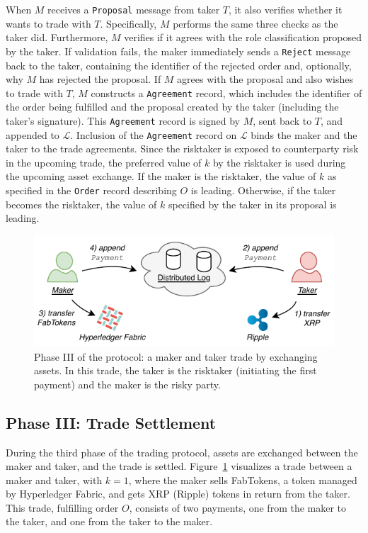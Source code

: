 When $ M $ receives a \texttt{Proposal} message from taker $ T $, it also verifies whether it wants to trade with $ T $.
Specifically, $ M $ performs the same three checks as the taker did.
Furthermore, $ M $ verifies if it agrees with the role classification proposed by the taker.
If validation fails, the maker immediately sends a \texttt{Reject} message back to the taker, containing the identifier of the rejected order and, optionally, why $ M $ has rejected the proposal.
If $ M $ agrees with the proposal and also wishes to trade with $ T $, $ M $ constructs a \texttt{Agreement} record, which includes the identifier of the order being fulfilled and the proposal created by the taker (including the taker's signature).
This \texttt{Agreement} record is signed by $ M $, sent back to $ T $, and appended to $ \mathcal{L} $.
Inclusion of the \texttt{Agreement} record on $ \mathcal{L} $ binds the maker and the taker to the trade agreements.
Since the risktaker is exposed to counterparty risk in the upcoming trade, the preferred value of $ k $ by the risktaker is used during the upcoming asset exchange.
If the maker is the risktaker, the value of $ k $ as specified in the \texttt{Order} record describing $ O $ is leading.
Otherwise, if the taker becomes the risktaker, the value of $ k $ specified by the taker in its proposal is leading.

\begin{figure}[h]
	\centering
	\includegraphics[width=0.68\linewidth]{xchange/assets/xchange_protocol_3}
	\caption{Phase III of the \ModelName{} protocol: a maker and taker trade by exchanging assets. In this trade, the taker is the risktaker (initiating the first payment) and the maker is the risky party.}
	\label{fig:matching_protocol_3}
\end{figure}

\subsection*{Phase III: Trade Settlement}
\label{sec:phase_settlement}
During the third phase of the \ModelName{} trading protocol, assets are exchanged between the maker and taker, and the trade is settled.
Figure~\ref{fig:matching_protocol_3} visualizes a trade between a maker and taker, with $ k = 1 $, where the maker sells FabTokens, a token managed by Hyperledger Fabric, and gets XRP (Ripple) tokens in return from the taker.
This trade, fulfilling order $ O $, consists of two payments, one from the maker to the taker, and one from the taker to the maker.

